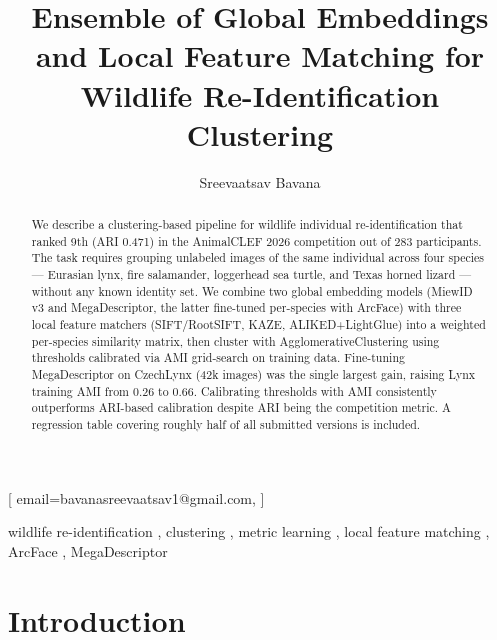 \documentclass[]{ceurart}
\begin{document}


\title{Ensemble of Global Embeddings and Local Feature Matching for Wildlife Re-Identification Clustering}

\author[1]{Sreevaatsav Bavana}[
  email=bavanasreevaatsav1@gmail.com,
]
\address[1]{Mahindra University, Hyderabad, India}

\begin{abstract}
We describe a clustering-based pipeline for wildlife individual re-identification
that ranked 9th (ARI 0.471) in the AnimalCLEF 2026 competition out of 283
participants. The task requires grouping unlabeled images of the same individual
across four species --- Eurasian lynx, fire salamander, loggerhead sea turtle,
and Texas horned lizard --- without any known identity set. We combine two global
embedding models (MiewID v3 and MegaDescriptor, the latter fine-tuned per-species
with ArcFace) with three local feature matchers (SIFT/RootSIFT, KAZE,
ALIKED+LightGlue) into a weighted per-species similarity matrix, then cluster
with AgglomerativeClustering using thresholds calibrated via AMI grid-search on
training data. Fine-tuning MegaDescriptor on CzechLynx (42k images) was the
single largest gain, raising Lynx training AMI from 0.26 to 0.66. Calibrating thresholds with AMI consistently outperforms ARI-based calibration
despite ARI being the competition metric. A regression table covering roughly
half of all submitted versions is included.
\end{abstract}

\begin{keywords}
  wildlife re-identification \sep
  clustering \sep
  metric learning \sep
  local feature matching \sep
  ArcFace \sep
  MegaDescriptor
\end{keywords}

\maketitle

\section{Introduction}
\end{document}
